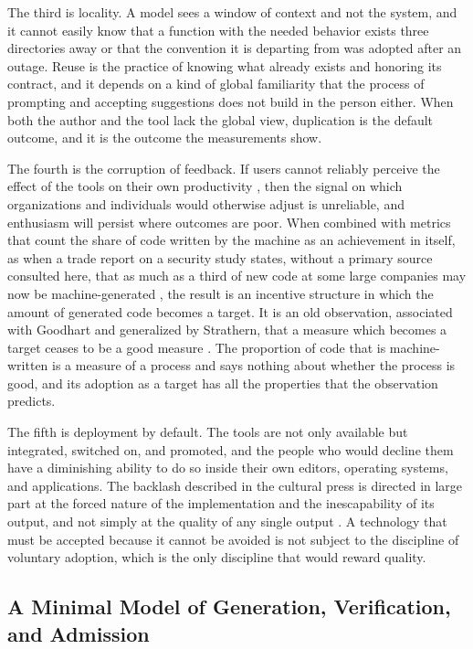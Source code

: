 \documentclass[11pt,a4paper]{article}
\theoremstyle{remark}
\begin{document}
The third is locality. A model sees a window of context and not the system, and it cannot easily know that a function with the needed behavior exists three directories away or that the convention it is departing from was adopted after an outage. Reuse is the practice of knowing what already exists and honoring its contract, and it depends on a kind of global familiarity that the process of prompting and accepting suggestions does not build in the person either. When both the author and the tool lack the global view, duplication is the default outcome, and it is the outcome the measurements show.

The fourth is the corruption of feedback. If users cannot reliably perceive the effect of the tools on their own productivity \cite{METR2025}, then the signal on which organizations and individuals would otherwise adjust is unreliable, and enthusiasm will persist where outcomes are poor. When combined with metrics that count the share of code written by the machine as an achievement in itself, as when a trade report on a security study states, without a primary source consulted here, that as much as a third of new code at some large companies may now be machine-generated \cite{TechRadar2025}, the result is an incentive structure in which the amount of generated code becomes a target. It is an old observation, associated with Goodhart and generalized by Strathern, that a measure which becomes a target ceases to be a good measure \cite{Strathern1997}. The proportion of code that is machine-written is a measure of a process and says nothing about whether the process is good, and its adoption as a target has all the properties that the observation predicts.

The fifth is deployment by default. The tools are not only available but integrated, switched on, and promoted, and the people who would decline them have a diminishing ability to do so inside their own editors, operating systems, and applications. The backlash described in the cultural press is directed in large part at the forced nature of the implementation and the inescapability of its output, and not simply at the quality of any single output \cite{PourOver2026}. A technology that must be accepted because it cannot be avoided is not subject to the discipline of voluntary adoption, which is the only discipline that would reward quality.

\subsection*{A Minimal Model of Generation, Verification, and Admission}
\end{document}
